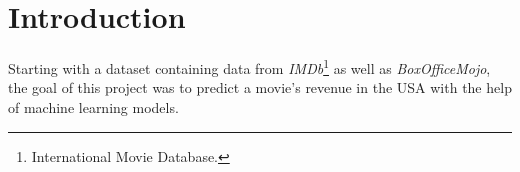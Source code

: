 \section{Introduction}

Starting with a dataset containing data from \textit{IMDb}\footnote{International Movie Database.} as well as \textit{BoxOfficeMojo}, the goal of this project was to predict a movie's revenue in the USA with the help of machine learning models.
